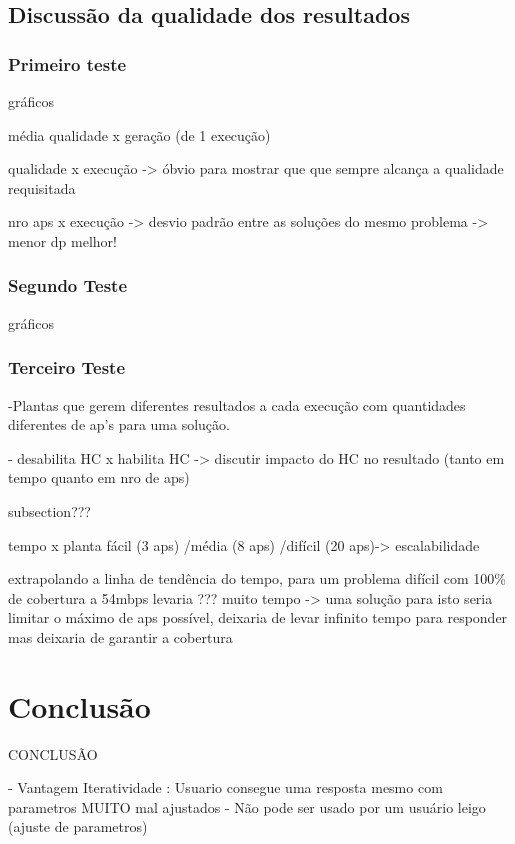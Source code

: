 \documentclass[tc,twoside]{iiufrgs}
\begin{document}
\section{Discussão da qualidade dos resultados}

\subsection{Primeiro teste}

gráficos

média qualidade x geração (de 1 execução)

qualidade x execução -> óbvio para mostrar que que sempre alcança a qualidade requisitada

nro aps x execução -> desvio padrão entre as soluções do mesmo problema -> menor dp melhor!

\subsection{Segundo Teste}

gráficos

\subsection{Terceiro Teste}

-Plantas que gerem diferentes resultados a cada execução com quantidades diferentes de ap's para uma solução.

- desabilita HC x habilita HC -> discutir impacto do HC no resultado (tanto em tempo quanto em nro de aps)

subsection{???}

tempo x planta fácil (3 aps) /média (8 aps) /difícil (20 aps)-> escalabilidade

extrapolando a linha de tendência do tempo, para um problema difícil com 100\% de cobertura a 54mbps levaria ??? muito tempo -> uma solução para isto seria limitar o máximo de aps possível, deixaria de levar infinito tempo para responder mas deixaria de garantir a cobertura

\chapter{Conclusão} 

CONCLUSÃO

- Vantagem Iteratividade : Usuario consegue uma resposta mesmo com parametros MUITO mal ajustados
- Não pode ser usado por um usuário leigo (ajuste de parametros)
\end{document}
